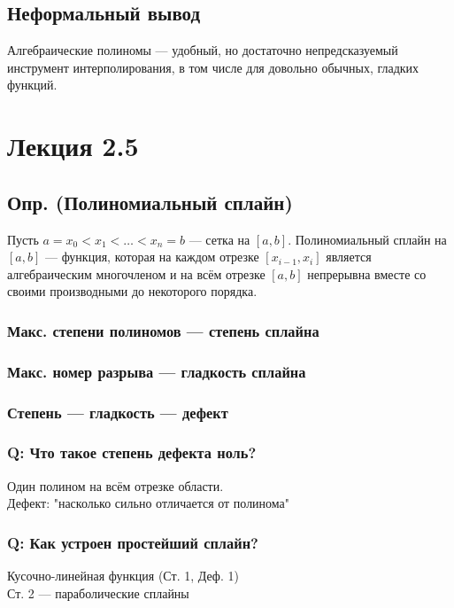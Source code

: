 \subsection*{Неформальный вывод}
Алгебраические полиномы --- удобный, но достаточно непредсказуемый инструмент интерполирования, в том числе для довольно обычных, гладких функций.

\section*{Лекция 2.5}

\subsection*{Опр. (Полиномиальный сплайн)}
Пусть $a = x_0 < x_1 < \ldots < x_n = b$ — сетка на $[a, b]$. Полиномиальный сплайн на $[a, b]$ --- функция, которая на каждом отрезке $[x_{i-1}, x_i]$ является алгебраическим многочленом и на всём отрезке $[a, b]$ непрерывна вместе со своими производными до некоторого порядка.

\subsubsection*{Макс. степени полиномов --- степень сплайна}

\subsubsection*{Макс. номер разрыва --- гладкость сплайна}

\subsubsection*{Степень --- гладкость --- дефект}

\subsubsection*{Q: Что такое степень дефекта ноль?}
Один полином на всём отрезке области. \\
Дефект: "насколько сильно отличается от полинома"

\subsubsection*{Q: Как устроен простейший сплайн?}
Кусочно-линейная функция (Ст. 1, Деф. 1) \\
Ст. 2 --- параболические сплайны

